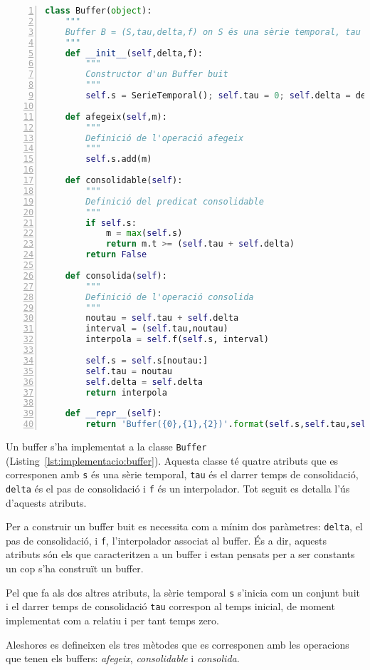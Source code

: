 \begin{lstlisting}[float,language=Python,caption=Implementació de la classe Buffer,label=lst:implementacio:buffer,numbers=left]            
class Buffer(object):
    """
    Buffer B = (S,tau,delta,f) on S és una sèrie temporal, tau el darrer temps de consolidació, delta el pas de consolidació i f un interpolador
    """
    def __init__(self,delta,f):
        """
        Constructor d'un Buffer buit
        """
        self.s = SerieTemporal(); self.tau = 0; self.delta = delta; self.f = f

    def afegeix(self,m):
        """
        Definició de l'operació afegeix
        """
        self.s.add(m)

    def consolidable(self):
        """
        Definició del predicat consolidable
        """
        if self.s:
            m = max(self.s)
            return m.t >= (self.tau + self.delta)
        return False

    def consolida(self):
        """
        Definició de l'operació consolida
        """
        noutau = self.tau + self.delta       
        interval = (self.tau,noutau)
        interpola = self.f(self.s, interval)

        self.s = self.s[noutau:]
        self.tau = noutau
        self.delta = self.delta
        return interpola

    def __repr__(self):
        return 'Buffer({0},{1},{2})'.format(self.s,self.tau,self.delta)       
\end{lstlisting}

Un buffer s'ha implementat a la classe \verb+Buffer+ (Listing~\ref{lst:implementacio:buffer}). Aquesta classe té quatre atributs que es corresponen amb \verb+s+ és una sèrie temporal, \verb+tau+ és el darrer temps de consolidació,  \verb+delta+ és el pas de consolidació i  \verb+f+  és un interpolador. Tot seguit es detalla l'ús d'aquests atributs.

Per a construir un buffer buit es necessita com a mínim dos paràmetres: \verb+delta+, el pas de consolidació, i \verb+f+, l'interpolador associat al buffer. És a dir, aquests atributs són els que caracteritzen a un buffer i estan pensats per a ser constants un cop s'ha construït un buffer. 

Pel que fa als dos altres atributs, la sèrie temporal \verb+s+ s'inicia com un conjunt buit i el darrer temps de consolidació \verb+tau+ correspon al temps inicial, de moment implementat com a relatiu i per tant temps zero.

Aleshores es defineixen els tres mètodes que es corresponen amb les operacions que tenen els buffers: \emph{afegeix}, \emph{consolidable} i \emph{consolida}.

